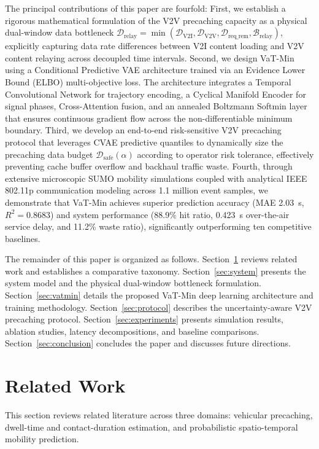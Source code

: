 \documentclass[journal]{IEEEtran}
\begin{document}
The principal contributions of this paper are fourfold:
First, we establish a rigorous mathematical formulation of the V2V precaching capacity as a physical dual-window data bottleneck $\mathcal{D}_{\text{relay}} = \min(\mathcal{D}_{\text{V2I}}, \mathcal{D}_{\text{V2V}}, \mathcal{D}_{\text{req\_rem}}, \mathcal{B}_{\text{relay}})$, explicitly capturing data rate differences between V2I content loading and V2V content relaying across decoupled time intervals.
Second, we design VaT-Min using a Conditional Predictive VAE architecture trained via an Evidence Lower Bound (ELBO) multi-objective loss. The architecture integrates a Temporal Convolutional Network for trajectory encoding, a Cyclical Manifold Encoder for signal phases, Cross-Attention fusion, and an annealed Boltzmann Softmin layer that ensures continuous gradient flow across the non-differentiable minimum boundary.
Third, we develop an end-to-end risk-sensitive V2V precaching protocol that leverages CVAE predictive quantiles to dynamically size the precaching data budget $\mathcal{D}_{\text{safe}}(\alpha)$ according to operator risk tolerance, effectively preventing cache buffer overflow and backhaul traffic waste.
Fourth, through extensive microscopic SUMO mobility simulations coupled with analytical IEEE 802.11p communication modeling across 1.1 million event samples, we demonstrate that VaT-Min achieves superior prediction accuracy (MAE 2.03~s, $R^2 = 0.8683$) and system performance (88.9\% hit ratio, 0.423~s over-the-air service delay, and 11.2\% waste ratio), significantly outperforming ten competitive baselines.

The remainder of this paper is organized as follows. Section~\ref{sec:related} reviews related work and establishes a comparative taxonomy. Section~\ref{sec:system} presents the system model and the physical dual-window bottleneck formulation. Section~\ref{sec:vatmin} details the proposed VaT-Min deep learning architecture and training methodology. Section~\ref{sec:protocol} describes the uncertainty-aware V2V precaching protocol. Section~\ref{sec:experiments} presents simulation results, ablation studies, latency decompositions, and baseline comparisons. Section~\ref{sec:conclusion} concludes the paper and discusses future directions.


\section{Related Work}\label{sec:related}

This section reviews related literature across three domains: vehicular precaching, dwell-time and contact-duration estimation, and probabilistic spatio-temporal mobility prediction.
\end{document}
